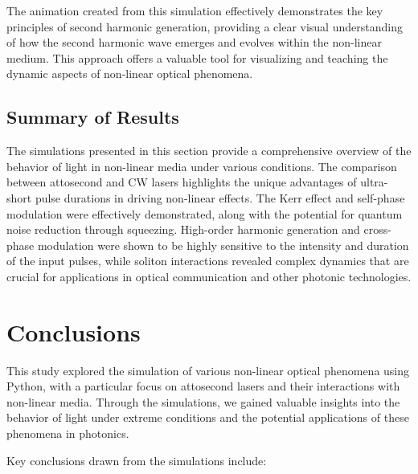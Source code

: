 \documentclass[12pt]{article}
\begin{document}
The animation created from this simulation effectively demonstrates the key principles of second harmonic generation, providing a clear visual understanding of how the second harmonic wave emerges and evolves within the non-linear medium. This approach offers a valuable tool for visualizing and teaching the dynamic aspects of non-linear optical phenomena.

\subsection{Summary of Results}

The simulations presented in this section provide a comprehensive overview of the behavior of light in non-linear media under various conditions. The comparison between attosecond and CW lasers highlights the unique advantages of ultra-short pulse durations in driving non-linear effects. The Kerr effect and self-phase modulation were effectively demonstrated, along with the potential for quantum noise reduction through squeezing. High-order harmonic generation and cross-phase modulation were shown to be highly sensitive to the intensity and duration of the input pulses, while soliton interactions revealed complex dynamics that are crucial for applications in optical communication and other photonic technologies.

\newpage

\section{Conclusions}\label{sec:conclusion}

This study explored the simulation of various non-linear optical phenomena using Python, with a particular focus on attosecond lasers and their interactions with non-linear media. Through the simulations, we gained valuable insights into the behavior of light under extreme conditions and the potential applications of these phenomena in photonics.

Key conclusions drawn from the simulations include:
\end{document}
